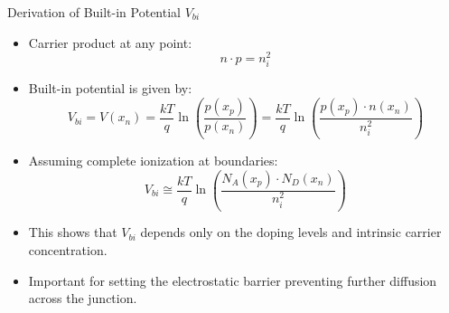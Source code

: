 \begin{frame}{Derivation of Built-in Potential $V_{bi}$}
    \begin{itemize}
        \item Carrier product at any point:
        \begin{equation}
            n \cdot p = n_i^2 
        \end{equation}
        \item Built-in potential is given by:
        \begin{equation}
            V_{bi} = V(x_n) = \frac{kT}{q} \ln\left( \frac{p(x_p)}{p(x_n)} \right) = \frac{kT}{q} \ln\left( \frac{p(x_p) \cdot n(x_n)}{n_i^2} \right) 
        \end{equation}
        \item Assuming complete ionization at boundaries:
        \begin{equation}
            V_{bi} \cong \frac{kT}{q} \ln\left( \frac{N_A(x_p) \cdot N_D(x_n)}{n_i^2} \right) 
        \end{equation}
        \item This shows that $V_{bi}$ depends only on the doping levels and intrinsic carrier concentration.
        \item Important for setting the electrostatic barrier preventing further diffusion across the junction.
    \end{itemize}
\end{frame}

